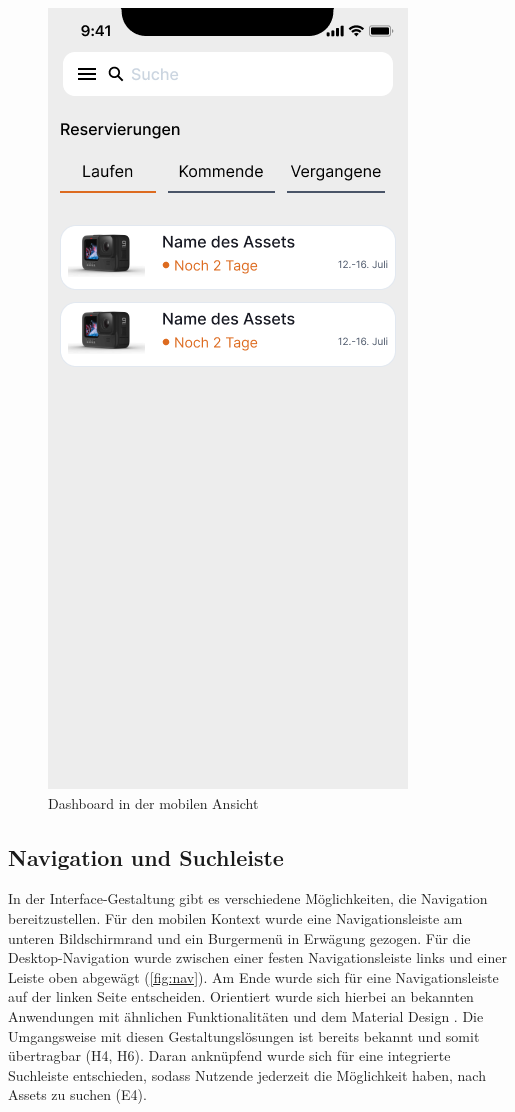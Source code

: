 \begin{figure}[h]
    \includegraphics[scale=0.3]{Bilder/Prototyp/Neu/V2.png}
    \caption[Dashboard in der mobilen Ansicht]{Dashboard in der mobilen Ansicht}
    \label{fig:home}
\end{figure}

\subsection{Navigation und Suchleiste}
In der Interface-Gestaltung gibt es verschiedene Möglichkeiten, die Navigation
bereitzustellen. Für den mobilen Kontext wurde eine Navigationsleiste am unteren
Bildschirmrand und ein Burgermenü in Erwägung gezogen. Für die
Desktop-Navigation wurde zwischen einer festen Navigationsleiste links und einer
Leiste oben abgewägt (\ref{fig:nav}). Am Ende wurde sich für eine
Navigationsleiste auf der linken Seite entscheiden. Orientiert wurde sich
hierbei an bekannten Anwendungen mit ähnlichen Funktionalitäten und dem Material
Design \cite{google_material_2022}. Die Umgangsweise mit diesen
Gestaltungslösungen ist bereits bekannt und somit übertragbar (H4, H6). Daran
anknüpfend wurde sich für eine integrierte Suchleiste entschieden, sodass
Nutzende jederzeit die Möglichkeit haben, nach Assets zu suchen
\cite{google_material_2022} (E4).


